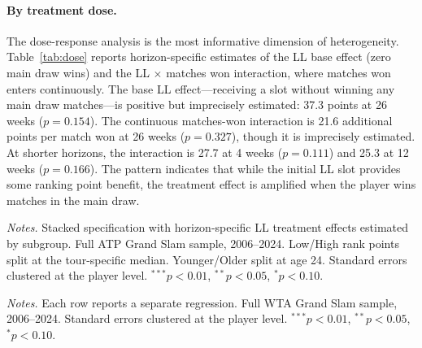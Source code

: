 \paragraph{By treatment dose.} The dose-response analysis is the most informative dimension of heterogeneity. Table~\ref{tab:dose} reports horizon-specific estimates of the LL base effect (zero main draw wins) and the LL $\times$ matches won interaction, where matches won enters continuously. The base LL effect---receiving a slot without winning any main draw matches---is positive but imprecisely estimated: 37.3 points at 26 weeks ($p = 0.154$). The continuous matches-won interaction is 21.6 additional points per match won at 26 weeks ($p = 0.327$), though it is imprecisely estimated. At shorter horizons, the interaction is 27.7 at 4 weeks ($p = 0.111$) and 25.3 at 12 weeks ($p = 0.166$). The pattern indicates that while the initial LL slot provides some ranking point benefit, the treatment effect is amplified when the player wins matches in the main draw.

\begin{table}[htbp]
\centering
\caption{ATP Grand Slam: Heterogeneous Effects}
\label{tab:hetero_atp}
\begin{threeparttable}
\small

\begin{tablenotes}
\footnotesize
\item \textit{Notes.} Stacked specification with horizon-specific LL treatment effects estimated by subgroup. Full ATP Grand Slam sample, 2006--2024. Low/High rank points split at the tour-specific median. Younger/Older split at age 24. Standard errors clustered at the player level. $^{***}p<0.01$, $^{**}p<0.05$, $^{*}p<0.10$.
\end{tablenotes}
\end{threeparttable}
\end{table}

\begin{table}[htbp]
\centering
\caption{WTA Grand Slam: Heterogeneous Effects}
\label{tab:hetero_wta}
\begin{threeparttable}
\small

\begin{tablenotes}
\footnotesize
\item \textit{Notes.} Each row reports a separate regression. Full WTA Grand Slam sample, 2006--2024. Standard errors clustered at the player level. $^{***}p<0.01$, $^{**}p<0.05$, $^{*}p<0.10$.
\end{tablenotes}
\end{threeparttable}
\end{table}

